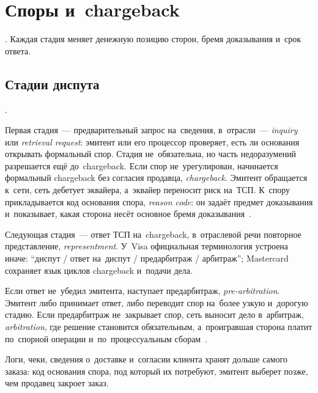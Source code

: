 
\chapter{Споры и~chargeback}\label{ch:disputes}

. Каждая
стадия меняет денежную позицию сторон, бремя доказывания и~срок ответа.

\section{Стадии диспута}\label{sec:disputes-lifecycle}

.

Первая стадия~--- предварительный запрос на~сведения, в~отрасли~---
\textit{inquiry} или \textit{retrieval request}: эмитент или его процессор
проверяет, есть ли основания открывать формальный спор. Стадия не~обязательна,
но часть недоразумений разрешается ещё до~chargeback.
Если спор не~урегулирован, начинается формальный chargeback без согласия
продавца, \textit{chargeback}. Эмитент обращается к~сети, сеть дебетует
эквайера, а~эквайер переносит риск на~ТСП. К~спору прикладывается код основания
спора, \textit{reason code}: он задаёт предмет доказывания и~показывает, какая
сторона несёт основное бремя доказывания~\cite{visa-core-rules}.

Следующая стадия~--- ответ ТСП на~chargeback, в~отраслевой речи
повторное представление, \textit{representment}. У~Visa официальная
терминология устроена иначе: \enquote{диспут / ответ на~диспут / предарбитраж /
арбитраж}; Mastercard сохраняет язык циклов chargeback и~подачи дела.

Если ответ не~убедил эмитента, наступает предарбитраж,
\textit{pre-arbitration}. Эмитент либо принимает ответ, либо переводит спор
на~более узкую и~дорогую стадию. Если предарбитраж не~закрывает спор, сеть
выносит дело в~арбитраж, \textit{arbitration}, где решение становится
обязательным, а~проигравшая сторона платит по~спорной операции
и~по~процессуальным сборам~\cite{visa-core-rules,mc-chargeback-guide}.

Логи, чеки, сведения о~доставке и~согласии клиента хранят дольше
самого заказа: код основания спора, под который их потребуют, эмитент выберет
позже, чем продавец закроет заказ. \FloatBarrier

